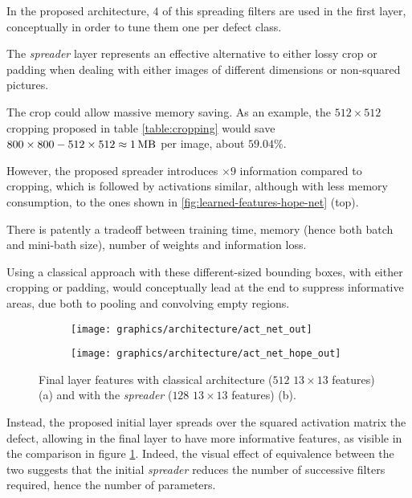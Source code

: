         \par{
            In the proposed architecture, $4$ of this spreading filters are used in the first layer, conceptually in order to tune them one per defect class.
        }
        \par{
            The \emph{spreader} layer represents an effective alternative to either lossy crop or padding when dealing with either images of different dimensions or non-squared pictures.
        }
        \par{
            The crop could allow massive memory saving. As an example, the $512\times 512$ cropping proposed in table \ref{table:cropping} would save $800\times 800 - 512\times 512 \approx \SI{1}{\mega\byte}$ per image, about $59.04\%$.
        }
        \par{
            However, the proposed spreader introduces $\times 9$ information compared to cropping, which is followed by activations similar, although with less memory consumption, to the ones shown in \ref{fig:learned-features-hope-net} (top).
        }
        \par{
            There is patently a tradeoff between training time, memory (hence both batch and mini-bath size), number of weights and information loss.
        }
        \par{
            Using a classical approach with these different-sized bounding boxes, with either cropping or padding, would conceptually lead at the end to suppress informative areas, due both to pooling and convolving empty regions.
        }
        \begin{figure}
            \centering
            \begin{subfigure}{.5\linewidth}
                \centering
                \texttt{[image: graphics/architecture/act\_net\_out]}
                \caption{}
            \end{subfigure}\hfill
            \begin{subfigure}{.5\linewidth}
                \centering
                \texttt{[image: graphics/architecture/act\_net\_hope\_out]}
                \caption{}
            \end{subfigure}
            \caption{Final layer features with classical architecture ($512$ $13\times 13$ features) (a) and with the \emph{spreader} ($128$ $13\times 13$ features) (b).}
            \label{fig:features-last-layer}
        \end{figure}
        \par{
            Instead, the proposed initial layer spreads over the squared activation matrix the defect, allowing in the final layer to have more informative features, as visible in the comparison in figure \ref{fig:features-last-layer}. Indeed, the visual effect of equivalence between the two suggests that the initial \emph{spreader} reduces the number of successive filters required, hence the number of parameters. 
        }
